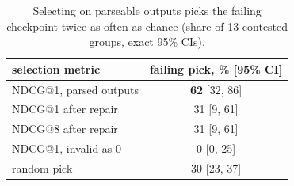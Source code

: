 \begin{table}[t]
\centering
\small
\begin{tabular}{@{}lc@{}}
\toprule
selection metric & failing pick, \% [95\% CI] \\
\midrule
NDCG@1, parsed outputs & \textbf{62} [32, 86] \\ %
NDCG@1 after repair & 31 [9, 61] \\ %
NDCG@8 after repair & 31 [9, 61] \\ %
NDCG@1, invalid as 0 & 0 [0, 25] \\ %
random pick & 30 [23, 37] \\ %
\bottomrule
\end{tabular}
\caption{Selecting on parseable outputs picks the failing checkpoint twice as often as chance (share of 13 contested groups, exact 95\% CIs).}
\label{tab:selection}
\end{table}

